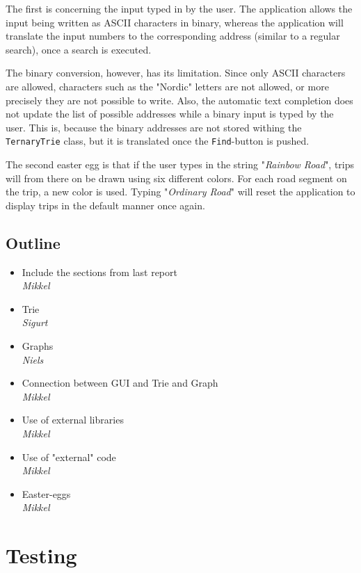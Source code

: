 \documentclass[a4paper,11pt]{article}
\begin{document}
The first is concerning the input typed in by the user. The application allows the input being written as ASCII characters in binary, whereas the application will translate the input numbers to the corresponding address (similar to a regular search), once a search is executed.

The binary conversion, however, has its limitation. Since only ASCII characters are allowed, characters such as the "Nordic" letters are not allowed, or more precisely they are not possible to write. Also, the automatic text completion does not update the list of possible addresses while a binary input is typed by the user. This is, because the binary addresses are not stored withing the \texttt{TernaryTrie} class, but it is translated once the \texttt{Find}-button is pushed.

The second easter egg is that if the user types in the string "\textit{Rainbow Road}", trips will from there on be drawn using six different colors. For each road segment on the trip, a new color is used. Typing "\textit{Ordinary Road}" will reset the application to display trips in the default manner once again.

\subsection{Outline}
\begin{itemize}
	\item Include the sections from last report \\
		\textsl{Mikkel}
	\item Trie \\
		\textsl{Sigurt}
	\item Graphs \\
		\textsl{Niels}
	\item Connection between GUI and Trie and Graph \\
		\textsl{Mikkel}
	\item Use of external libraries \\
		\textsl{Mikkel}
	\item Use of "external" code \\
		\textsl{Mikkel}
	\item Easter-eggs \\
		\textsl{Mikkel}
\end{itemize}

\pagebreak
\section{Testing}
\label{sec:Testing}
\end{document}
